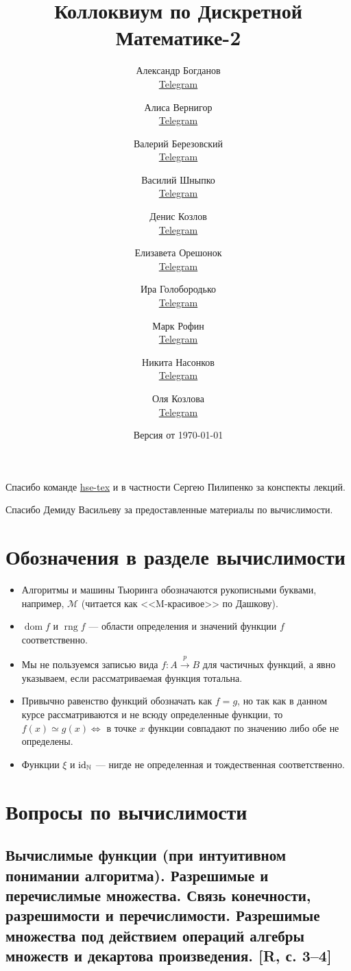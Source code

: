 \documentclass[a4paper, fleqn]{article}
\title{Коллоквиум по Дискретной Математике-2}
\author{
    Александр Богданов   \\ \href{https://t.me/SphericalPotatoInVacuum}{Telegram} \and
    Алиса Вернигор       \\ \href{https://t.me/allisyonok}{Telegram} \and
    Валерий Березовский  \\ \href{https://t.me/jeembogod}{Telegram} \and
    Василий Шныпко       \\ \href{https://t.me/yourvash}{Telegram} \and
    Денис Козлов         \\ \href{https://t.me/DKozl50}{Telegram} \and
    Елизавета Орешонок   \\ \href{https://t.me/eaoresh}{Telegram} \and
    Ира Голобородько     \\ \href{https://t.me/Ira4kgl}{Telegram} \and
    Марк Рофин           \\ \href{https://t.me/Broccoliman}{Telegram} \and
    Никита Насонков      \\ \href{https://t.me/nnv_nick}{Telegram} \and
    Оля Козлова          \\ \href{https://t.me/grenlayk}{Telegram}
}
\date{Версия от {\ddmmyyyydate\today} \currenttime}
\DeclareMathOperator{\dom}{\mathop{\mathrm{dom}}}
\DeclareMathOperator{\rng}{\mathop{\mathrm{rng}}}
\begin{document}
    \maketitle

    Спасибо команде \href{https://github.com/hse-tex/hse-tex}{hse-tex} 
    и в частности Сергею Пилипенко за конспекты лекций. 

    Спасибо Демиду Васильеву за предоставленные материалы по вычислимости.

    \tableofcontents

    \newpage

\section{Обозначения в разделе вычислимости}

    \begin{itemize}
        \item Алгоритмы и машины Тьюринга обозначаются рукописными буквами, например, $\mathcal{M}$ (читается как <<M-красивое>> по Дашкову).

        \item $\dom f$ и $\rng f$ --- области определения и значений функции $f$ соответственно.

        \item Мы не пользуемся записью вида $f : A \xrightarrow{p} B$ для частичных функций, а явно указываем, если рассматриваемая функция тотальна.

        \item Привычно равенство функций обозначать как $f = g$, но так как в данном курсе рассматриваются и не всюду определенные функции, то $f(x) \simeq g(x) \iff$ в точке $x$ функции совпадают по значению либо обе не определены.

        \item Функции $\xi$ и $\text{id}_{\mathbb{N}}$ --- нигде не определенная и тождественная соответственно.
    \end{itemize}

\section{Вопросы по вычислимости}

    \subsection{Вычислимые функции (при интуитивном понимании алгоритма). Разрешимые и перечислимые множества. Связь конечности, разрешимости и перечислимости. Разрешимые множества под действием операций алгебры множеств и декартова произведения. [R, с. 3–4]}
\end{document}
